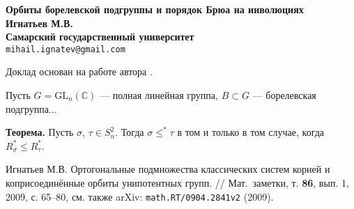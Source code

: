 \documentclass[12pt, a4paper]{article}
\begin{document}
\renewcommand{\refname}{\normalsize{\textbf{Список литературы}}}

\begin{center}
{\large\bf Орбиты борелевской
подгруппы и порядок Брюа на инволюциях}\\
{\bf Игнатьев М.В.}\\
{\bf Самарский государственный университет}\\
\texttt{mihail.ignatev@gmail.com}
\end{center}

Доклад основан на работе автора \cite{Ignatev}.

Пусть $G=\mathrm{GL}_n(\mathbb{C})$ --- полная линейная группа, $B\subset G$ --- борелевская подгруппа$\ldots$

\bigskip\textbf{Теорема.} Пусть $\sigma$, $\tau\in S_n^2$. Тогда $\sigma\leqslant^*\tau$ в том и только в том случае, когда $R_{\sigma}^*\leqslant R_{\tau}^*$.

\bigskip
\begin{thebibliography}{XXXX}
 Игнатьев М.В. Ортогональные подмножества классических
систем корней и коприсоединённые орбиты унипотентных групп. //
Мат.~заметки, т. \textbf{86}, вып. 1, 2009, с. 65--80, см. также
arXiv: \texttt{math.RT/0904.2841v2} (2009).
\end{thebibliography}
\end{document}
